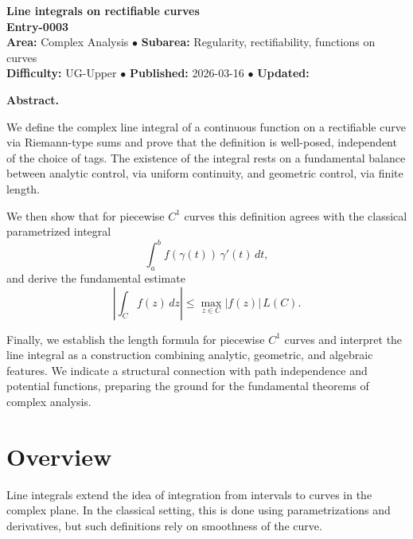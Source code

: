 \documentclass{article}
\begin{document}
\begin{center}

{\Large \textbf{Line integrals on rectifiable curves}}\\[0.6em]
{\normalsize \textbf{Entry-0003}}\\[1.0em]

\textbf{Area:} Complex Analysis \quad $\bullet$ \quad
\textbf{Subarea:} Regularity, rectifiability, functions on curves\\[0.35em]
\textbf{Difficulty:} UG-Upper \quad $\bullet$ \quad
\textbf{Published:} 2026-03-16 \quad $\bullet$ \quad
\textbf{Updated:}

\end{center}

\vspace{1.2em}

\noindent\textbf{Abstract.}
\begin{center}
\begin{minipage}{0.85\textwidth}
\small
We define the complex line integral of a continuous function on a rectifiable curve via Riemann-type sums and
prove that the definition is well-posed, independent of the choice of tags. The existence of the integral rests on a
fundamental balance between analytic control, via uniform continuity, and geometric control, via finite length.

We then show that for piecewise \(C^1\) curves this definition agrees with the classical parametrized integral
\[
\int_a^b f(\gamma(t))\,\gamma'(t)\,dt,
\]
and derive the fundamental estimate
\[
\left|\int_C f(z)\,dz\right| \le \max_{z\in C}|f(z)|\,L(C).
\]

Finally, we establish the length formula for piecewise \(C^1\) curves and interpret the line integral as a construction
combining analytic, geometric, and algebraic features. We indicate a structural connection with path independence and
potential functions, preparing the ground for the fundamental theorems of complex analysis.
\end{minipage}
\end{center}

\section{Overview}

Line integrals extend the idea of integration from intervals to curves in the complex plane. In the classical setting, this is
done using parametrizations and derivatives, but such definitions rely on smoothness of the curve.
\end{document}
